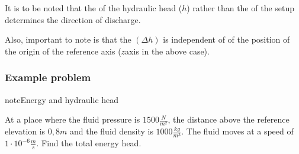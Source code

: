 \documentclass[letterpaper,10pt,english]{sphinxmanual}
\begin{document}
It is to be noted that the  of the hydraulic head (\(h\)) rather than the  of the set\sphinxhyphen{}up determines the direction of discharge.

Also, important to note is that the  \((\Delta h)\) is independent of of the position of the origin of the reference axis  (\(z\)\sphinxhyphen{}axis in the above case).


\subsubsection{Example problem}
\label{\detokenize{contents/flow/lecture_04/14_darcy_law_K:example-problem}}
\begin{sphinxadmonition}{note}{Energy and hydraulic head}

At a place where the fluid pressure is \(1500 \frac{N}{m^2}\), the distance above the reference elevation is \(0,8 m\) and the fluid density is \(1000 \frac{kg}{m^3}\). The fluid moves at a speed of \(1 \cdot 10^{-6} \frac{m}{s}\). Find the total energy head.
\end{sphinxadmonition}
\end{document}
